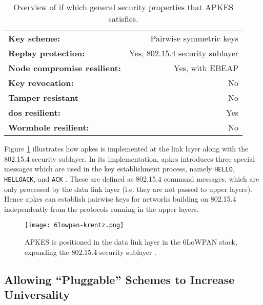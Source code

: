 \begin{table}[h]
\centering
\begin{tabular}{|l|r|}\hline
\textbf{Key scheme:} & Pairwise symmetric keys  \\
\textbf{Replay protection:}	 & Yes, 802.15.4 security sublayer \\
\textbf{Node compromise resilient:} & Yes, with EBEAP  \\
\textbf{Key revocation:} & No \\
\textbf{Tamper resistant} & No \\
\textbf{\gls{dos} resilient:} & Yes \\
\textbf{Wormhole resilient:} & No \\ \hline
\end{tabular}
\caption{Overview of if which general security properties that APKES satisfies.}
\label{tab:apkes-props}
\end{table}

Figure \ref{fig:6lowpan-krentz} illustrates how \gls{apkes} is implemented at the link layer along with the 802.15.4 security sublayer. In its implementation, \gls{apkes} introduces three special messages which are used in the key establishment process, namely \texttt{HELLO}, \texttt{HELLOACK}, and \texttt{ACK} \cite{krentz20136lowpan}. These are defined as 802.15.4 command messages, which are only processed by the data link layer (i.e. they are not passed to upper layers). Hence \gls{apkes} can establish pairwise keys for networks building on 802.15.4 independently from the protocols running in the upper layers.

\begin{figure}
	\centering
	\texttt{[image: 6lowpan-krentz.png]}
	\caption[APKES is positioned in the data link layer in the 6LoWPAN stack, expanding the 802.15.4 security sublayer.]{APKES is positioned in the data link layer in the 6LoWPAN stack, expanding the 802.15.4 security sublayer \cite{krentz20136lowpan}.}
	\label{fig:6lowpan-krentz}
\end{figure}


\subsection{Allowing ``Pluggable'' Schemes to Increase Universality} 

